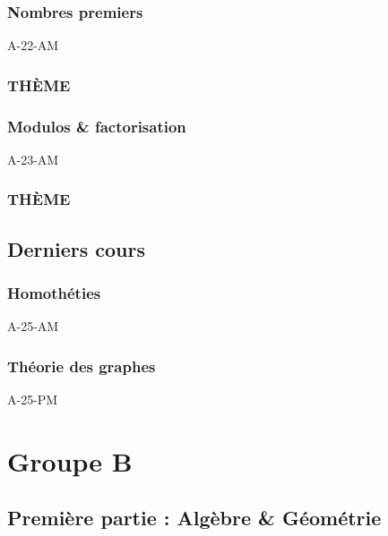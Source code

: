 \documentclass[poly,trombi]{valbonne}
\begin{document}
\subsection{Nombres premiers}

{A-22-AM}

\subsection{THÈME}


\subsection{Modulos \& factorisation}

{A-23-AM}

\subsection{THÈME}



\section{Derniers cours}

\subsection{Homothéties}
{A-25-AM}

\subsection{Théorie des graphes}

{A-25-PM}






\chapter{Groupe B}

\minitoc \clearpage

\section{Première partie : Algèbre \& Géométrie}
\end{document}
